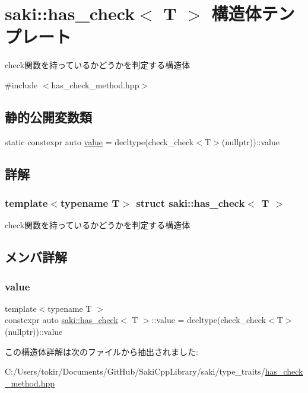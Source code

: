 \hypertarget{structsaki_1_1has__check}{}\section{saki\+:\+:has\+\_\+check$<$ T $>$ 構造体テンプレート}
\label{structsaki_1_1has__check}


check関数を持っているかどうかを判定する構造体  




{\ttfamily \#include $<$has\+\_\+check\+\_\+method.\+hpp$>$}

\subsection*{静的公開変数類}
\begin{DoxyCompactItemize}
\item 
static constexpr auto \mbox{\hyperlink{structsaki_1_1has__check_aaf5325bde7c74e8afe2a69f8d657d62b}{value}} = decltype(check\+\_\+check$<$T$>$(nullptr))\+::value
\end{DoxyCompactItemize}


\subsection{詳解}
\subsubsection*{template$<$typename T$>$\newline
struct saki\+::has\+\_\+check$<$ T $>$}

check関数を持っているかどうかを判定する構造体 

\subsection{メンバ詳解}
\mbox{\label{structsaki_1_1has__check_aaf5325bde7c74e8afe2a69f8d657d62b}} 
\subsubsection{\texorpdfstring{value}{value}}
{\footnotesize\ttfamily template$<$typename T $>$ \\
constexpr auto \mbox{\hyperlink{structsaki_1_1has__check}{saki\+::has\+\_\+check}}$<$ T $>$\+::value = decltype(check\+\_\+check$<$T$>$(nullptr))\+::value\hspace{0.3cm}{\ttfamily [static]}}



この構造体詳解は次のファイルから抽出されました\+:\begin{DoxyCompactItemize}
\item 
C\+:/\+Users/tokir/\+Documents/\+Git\+Hub/\+Saki\+Cpp\+Library/saki/type\+\_\+traits/\mbox{\hyperlink{has__check__method_8hpp}{has\+\_\+check\+\_\+method.\+hpp}}\end{DoxyCompactItemize}
